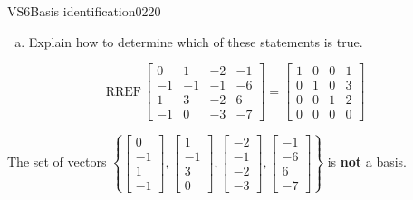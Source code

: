 \begin{exercise}{VS6}{Basis identification}{0220}
\begin{exerciseStatement}
\begin{enumerate}[(a)]
\begin{itemize}
 
\end{itemize}

     
\item  

 Explain how to determine which of these statements is true. 

 
\end{enumerate}

     \end{exerciseStatement}
 \begin{exerciseAnswer} 

 \[
\mathrm{RREF}\, \left[\begin{array}{cccc}
0 & 1 & -2 & -1 \\
-1 & -1 & -1 & -6 \\
1 & 3 & -2 & 6 \\
-1 & 0 & -3 & -7
\end{array}\right] = \left[\begin{array}{cccc}
1 & 0 & 0 & 1 \\
0 & 1 & 0 & 3 \\
0 & 0 & 1 & 2 \\
0 & 0 & 0 & 0
\end{array}\right]
            \] 

 

 The set of vectors \(\left\{ \left[\begin{array}{c}
0 \\
-1 \\
1 \\
-1
\end{array}\right] , \left[\begin{array}{c}
1 \\
-1 \\
3 \\
0
\end{array}\right] , \left[\begin{array}{c}
-2 \\
-1 \\
-2 \\
-3
\end{array}\right] , \left[\begin{array}{c}
-1 \\
-6 \\
6 \\
-7
\end{array}\right] \right\}\) is \textbf{not} a basis. 

 \end{exerciseAnswer}
 \end{exercise}



